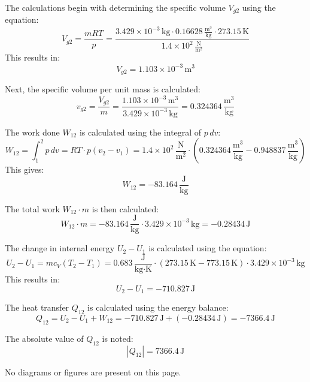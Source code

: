 The calculations begin with determining the specific volume \( V_{g2} \) using the equation:  
\[
V_{g2} = \frac{mRT}{p} = \frac{3.429 \times 10^{-3} \, \text{kg} \cdot 0.16628 \, \frac{\text{m}^3}{\text{kg}} \cdot 273.15 \, \text{K}}{1.4 \times 10^2 \, \frac{\text{N}}{\text{m}^2}}
\]  
This results in:  
\[
V_{g2} = 1.103 \times 10^{-3} \, \text{m}^3
\]  

Next, the specific volume per unit mass is calculated:  
\[
v_{g2} = \frac{V_{g2}}{m} = \frac{1.103 \times 10^{-3} \, \text{m}^3}{3.429 \times 10^{-3} \, \text{kg}} = 0.324364 \, \frac{\text{m}^3}{\text{kg}}
\]  

The work done \( W_{12} \) is calculated using the integral of \( p \, dv \):  
\[
W_{12} = \int_{1}^{2} p \, dv = R T \cdot p (v_2 - v_1) = 1.4 \times 10^2 \, \frac{\text{N}}{\text{m}^2} \cdot (0.324364 \, \frac{\text{m}^3}{\text{kg}} - 0.948837 \, \frac{\text{m}^3}{\text{kg}})
\]  
This gives:  
\[
W_{12} = -83.164 \, \frac{\text{J}}{\text{kg}}
\]  

The total work \( W_{12} \cdot m \) is then calculated:  
\[
W_{12} \cdot m = -83.164 \, \frac{\text{J}}{\text{kg}} \cdot 3.429 \times 10^{-3} \, \text{kg} = -0.28434 \, \text{J}
\]  

The change in internal energy \( U_2 - U_1 \) is calculated using the equation:  
\[
U_2 - U_1 = m c_V (T_2 - T_1) = 0.683 \, \frac{\text{J}}{\text{kg·K}} \cdot (273.15 \, \text{K} - 773.15 \, \text{K}) \cdot 3.429 \times 10^{-3} \, \text{kg}
\]  
This results in:  
\[
U_2 - U_1 = -710.827 \, \text{J}
\]  

The heat transfer \( Q_{12} \) is calculated using the energy balance:  
\[
Q_{12} = U_2 - U_1 + W_{12} = -710.827 \, \text{J} + (-0.28434 \, \text{J}) = -7366.4 \, \text{J}
\]  

The absolute value of \( Q_{12} \) is noted:  
\[
|Q_{12}| = 7366.4 \, \text{J}
\]  

No diagrams or figures are present on this page.